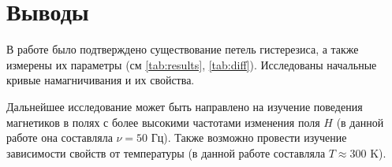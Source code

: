 \section*{Выводы}

В работе было подтверждено существование петель гистерезиса, а также измерены их параметры (см \ref{tab:results}, \ref{tab:diff}). Исследованы начальные кривые намагничивания и их свойства.

Дальнейшее исследование может быть направлено на изучение поведения магнетиков в полях с более высокими частотами изменения поля $H$ (в данной работе она составляла $\nu = 50$ Гц). Также возможно провести изучение зависимости свойств от температуры (в данной работе составляла $T \approx 300$ K).